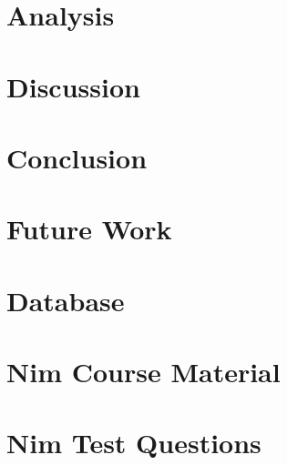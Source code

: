 \documentclass{memoir}
\begin{document}
\chapter{Analysis}

\chapter{Discussion}

\chapter{Conclusion}

\chapter{Future Work}


\appendix
\chapter{Database}
\label{ax_database}

\chapter{Nim Course Material}
\label{ax_resources}

\chapter{Nim Test Questions}
\label{ax_questions}





\end{document}
